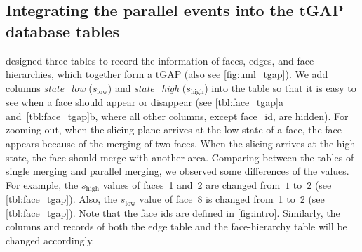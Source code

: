 \documentclass{ica}
\begin{document}
\subsection{Integrating the parallel events into the tGAP database tables}
\label{sec:integrate_tgap}

\citet[]{Meijers2011Thesis} designed three tables 
to record the information of
faces, edges, and face hierarchies, 
which together form a tGAP
(also see \fig\ref{fig:uml_tgap}).
We add columns \emph{state\_low} ($s_\mathrm{low}$) 
and \emph{state\_high} ($s_\mathrm{high}$) into the table 
so that it is easy to see when a face should appear or disappear 
(see \tbls\ref{tbl:face_tgap}a and~\ref{tbl:face_tgap}b,
where all other columns, except face\_id, are hidden).
For zooming out,
when the slicing plane arrives at the low state of a face,
the face appears because of the merging of two faces.
When the slicing arrives at the high state,
the face should merge with another area.
Comparing between the tables of single merging 
and parallel merging,
we observed some differences of the values.
For example, the $s_\mathrm{high}$ values of faces~1 and~2 
are changed from~$1$ to~$2$
(see \tbl\ref{tbl:face_tgap}).
Also, the $s_\mathrm{low}$ value of face~8 is changed from~1 to~2
(see \tbl\ref{tbl:face_tgap}).
Note that the face ids are defined in \fig\ref{fig:intro}.
Similarly, the columns and records of 
both the edge table and the face-hierarchy table 
will be changed accordingly.
\end{document}
